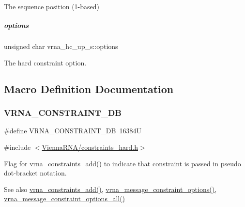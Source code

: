 The sequence position (1-\/based) 

\mbox{\label{group__hard__constraints_a468414760f373f7dc0eb1fd47cf708d0}} 
\subparagraph{\texorpdfstring{options}{options}}
{\footnotesize\ttfamily unsigned char vrna\+\_\+hc\+\_\+up\+\_\+s\+::options}



The hard constraint option. 



\subsection{Macro Definition Documentation}
\mbox{\label{group__hard__constraints_ga4bfc2f15c4f261c62a11af9d2aa80c90}} 
\subsubsection{\texorpdfstring{V\+R\+N\+A\+\_\+\+C\+O\+N\+S\+T\+R\+A\+I\+N\+T\+\_\+\+DB}{VRNA\_CONSTRAINT\_DB}}
{\footnotesize\ttfamily \#define V\+R\+N\+A\+\_\+\+C\+O\+N\+S\+T\+R\+A\+I\+N\+T\+\_\+\+DB~16384U}



{\ttfamily \#include $<$\mbox{\hyperlink{constraints__hard_8h}{Vienna\+R\+N\+A/constraints\+\_\+hard.\+h}}$>$}



Flag for \mbox{\hyperlink{group__constraints_ga35a401f680969a556858a8dd5f1d07cc}{vrna\+\_\+constraints\+\_\+add()}} to indicate that constraint is passed in pseudo dot-\/bracket notation. 

\begin{DoxySeeAlso}{See also}
\mbox{\hyperlink{group__constraints_ga35a401f680969a556858a8dd5f1d07cc}{vrna\+\_\+constraints\+\_\+add()}}, \mbox{\hyperlink{group__constraints_gaa1f20b53bf09ac2e6b0dbb13f7d89670}{vrna\+\_\+message\+\_\+constraint\+\_\+options()}}, \mbox{\hyperlink{group__constraints_gaec7e13fa0465c2acc7a621d1aecb709f}{vrna\+\_\+message\+\_\+constraint\+\_\+options\+\_\+all()}} 
\end{DoxySeeAlso}
\mbox{\label{group__hard__constraints_ga29ebe940110d60ab798fdacbcdbbfb7d}} 
